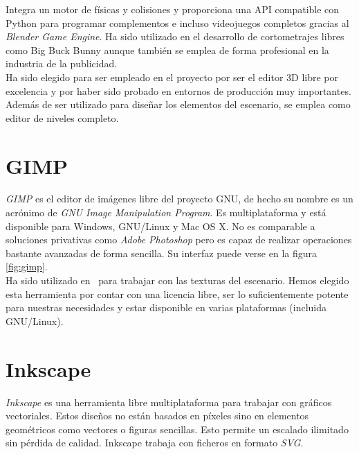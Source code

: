 Integra un motor de físicas y colisiones y proporciona una API compatible
con Python para programar complementos e incluso videojuegos completos
gracias al \textit{Blender Game Engine}. Ha sido utilizado en el desarrollo
de cortometrajes libres como Big Buck Bunny aunque también se emplea de forma
profesional en la industria de la publicidad.\\

Ha sido elegido para ser empleado en el proyecto por ser el editor 3D
libre por excelencia y por haber sido probado en entornos de producción
muy importantes. Además de ser utilizado para diseñar los elementos
del escenario, se emplea como editor de niveles completo.\\


\section*{GIMP}

\textit{GIMP} \cite{website:gimp} es el editor de imágenes libre del proyecto
GNU, de hecho su nombre es un acrónimo de \textit{GNU Image Manipulation
Program}. Es multiplataforma y está disponible para Windows, GNU/Linux y Mac OS X.
No es comparable a soluciones privativas como \textit{Adobe Photoshop} pero
es capaz de realizar operaciones bastante avanzadas de forma sencilla.
Su interfaz puede verse en la figura \ref{fig:gimp}.\\

Ha sido utilizado en \juego\ para trabajar con las texturas del escenario.
Hemos elegido esta herramienta por contar con una licencia libre, ser
lo suficientemente potente para nuestras necesidades y estar disponible
en varias plataformas (incluida GNU/Linux).\\


\section*{Inkscape}

\textit{Inkscape} \cite{website:inkscape} es una herramienta libre multiplataforma
para trabajar con gráficos vectoriales. Estos diseños no están basados en píxeles
sino en elementos geométricos como vectores o figuras sencillas. Esto permite
un escalado ilimitado sin pérdida de calidad. Inkscape trabaja con ficheros
en formato \textit{SVG}.\\


